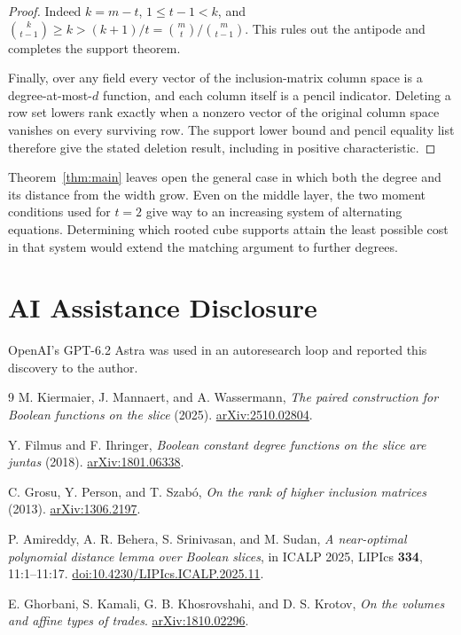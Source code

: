 \documentclass[11pt,letterpaper]{article}
\numberwithin{equation}{section}
\begin{document}
\begin{proof}
Indeed $k=m-t$, $1\le t-1<k$, and $\binom{k}{t-1}\ge k>(k+1)/t=\binom mt/\binom m{t-1}$. This
rules out the antipode and completes the support theorem.

Finally, over any field every vector of the inclusion-matrix column space is a
degree-at-most-$d$ function, and each column itself is a pencil indicator. Deleting a row set
lowers rank exactly when a nonzero vector of the original column space vanishes on every
surviving row. The support lower bound and pencil equality list therefore give the stated
deletion result, including in positive characteristic.
\end{proof}

Theorem~\ref{thm:main} leaves open the general case in which both the degree and its distance
from the width grow. Even on the middle layer, the two moment conditions used for $t=2$ give
way to an increasing system of alternating equations. Determining which rooted cube supports
attain the least possible cost in that system would extend the matching argument to further
degrees.

\section*{AI Assistance Disclosure}

OpenAI's GPT-6.2 Astra was used in an autoresearch loop and reported this discovery to the author.

\begingroup\small
\begin{thebibliography}{9}
M. Kiermaier, J. Mannaert, and A. Wassermann, \emph{The paired construction for Boolean
functions on the slice} (2025). \href{https://arxiv.org/abs/2510.02804}{arXiv:2510.02804}.

Y. Filmus and F. Ihringer, \emph{Boolean constant degree functions on the slice are juntas}
(2018). \href{https://arxiv.org/abs/1801.06338}{arXiv:1801.06338}.

C. Grosu, Y. Person, and T. Szab\'o, \emph{On the rank of higher inclusion matrices} (2013).
\href{https://arxiv.org/abs/1306.2197}{arXiv:1306.2197}.

P. Amireddy, A. R. Behera, S. Srinivasan, and M. Sudan, \emph{A near-optimal polynomial
distance lemma over Boolean slices}, in ICALP 2025, LIPIcs \textbf{334}, 11:1--11:17.
\href{https://doi.org/10.4230/LIPIcs.ICALP.2025.11}{doi:10.4230/LIPIcs.ICALP.2025.11}.

E. Ghorbani, S. Kamali, G. B. Khosrovshahi, and D. S. Krotov, \emph{On the volumes and affine
types of trades}. \href{https://arxiv.org/abs/1810.02296}{arXiv:1810.02296}.
\end{thebibliography}
\endgroup
\end{document}
